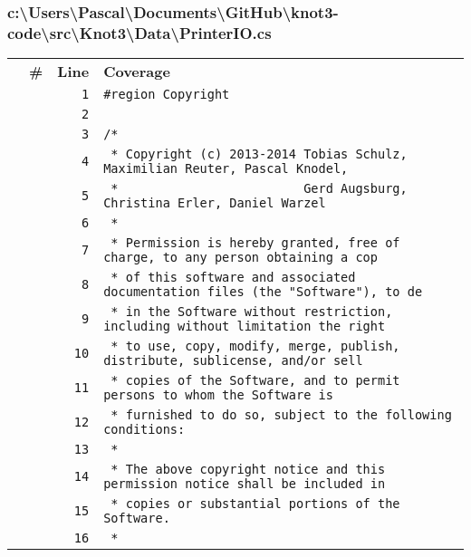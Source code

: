 \documentclass[a4paper,10pt]{article}
\begin{document}
\subsubsection{c:\textbackslash Users\textbackslash Pascal\textbackslash Documents\textbackslash GitHub\textbackslash knot3-code\textbackslash src\textbackslash Knot3\textbackslash Data\textbackslash PrinterIO.cs}
\begin{longtable}[l]{lrrl}
\textbf{} & \textbf{\#} & \textbf{Line} & \textbf{Coverage}\\
\cellcolor{gray} &  & \verb~1~ & \verb~#region Copyright~\\
\cellcolor{gray} &  & \verb~2~ & \verb~~\\
\cellcolor{gray} &  & \verb~3~ & \verb~/*~\\
\cellcolor{gray} &  & \verb~4~ & \verb~ * Copyright (c) 2013-2014 Tobias Schulz, Maximilian Reuter, Pascal Knodel,~\\
\cellcolor{gray} &  & \verb~5~ & \verb~ *                         Gerd Augsburg, Christina Erler, Daniel Warzel~\\
\cellcolor{gray} &  & \verb~6~ & \verb~ *~\\
\cellcolor{gray} &  & \verb~7~ & \verb~ * Permission is hereby granted, free of charge, to any person obtaining a cop~\\
\cellcolor{gray} &  & \verb~8~ & \verb~ * of this software and associated documentation files (the "Software"), to de~\\
\cellcolor{gray} &  & \verb~9~ & \verb~ * in the Software without restriction, including without limitation the right~\\
\cellcolor{gray} &  & \verb~10~ & \verb~ * to use, copy, modify, merge, publish, distribute, sublicense, and/or sell~\\
\cellcolor{gray} &  & \verb~11~ & \verb~ * copies of the Software, and to permit persons to whom the Software is~\\
\cellcolor{gray} &  & \verb~12~ & \verb~ * furnished to do so, subject to the following conditions:~\\
\cellcolor{gray} &  & \verb~13~ & \verb~ *~\\
\cellcolor{gray} &  & \verb~14~ & \verb~ * The above copyright notice and this permission notice shall be included in ~\\
\cellcolor{gray} &  & \verb~15~ & \verb~ * copies or substantial portions of the Software.~\\
\cellcolor{gray} &  & \verb~16~ & \verb~ *~\\

\end{longtable}
\end{document}

